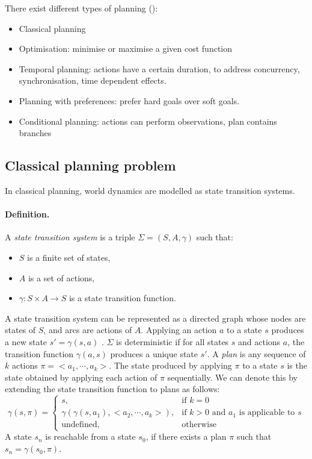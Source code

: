 There exist different types of planning (\cite{ROSplanAAAI17tutorial}):
\begin{itemize}
    \item Classical planning
    \item Optimisation: minimise or maximise a given cost function
    \item Temporal planning: actions have a certain duration, to address concurrency, synchronisation, time dependent effects.
    \item Planning with preferences: prefer hard goals over soft goals.
    \item Conditional planning: actions can perform observations, plan contains branches
\end{itemize}

\subsection{Classical planning problem}\label{subsec:Classical planning problem}
In classical planning, world dynamics are modelled as state transition systems.

\paragraph{Definition.}
A \textit{state transition system} is a triple $\Sigma = (S, A, \gamma)$ such that:
\begin{itemize}
\item $S$ is a finite set of states,
\item $A$ is a set of actions,
\item $\gamma : S \times A \rightarrow S$ is a state transition function.
\end{itemize}

\noindent A state transition system can be represented as a directed graph whose nodes are states of $S$, and arcs are actions of $A$. 
Applying an action $a$ to a state $s$ produces a new state $s'= \gamma(s,a)$ 
. 
$\Sigma$ is deterministic if for all states $s$ and actions $a$, the transition function $\gamma(a, s)$ produces a unique state $s'$. 
A \textit{plan} is any sequence of $k$ actions $\pi = <a_1,\cdots, a_k>$. The state produced by applying $\pi$ to a state $s$ is the state obtained by applying each action of $\pi$ sequentially. 
We can denote this by extending the state transition function to plans as follows:
\[\gamma(s,\pi)=\left\{
\begin{array}{ll}
   s, &\mbox{if $k=0$} \\
   \gamma(\gamma(s,a_1),<a_2,\cdots, a_k>), &\mbox{if $k>0$ and $a_1$ is applicable to $s$} \\
   \mbox{undefined}, &\mbox{otherwise}
\end{array}
\right.
\]
A state $s_n$ is reachable from a state $s_0$, if there exists a plan $\pi$ such that $s_{n} = \gamma(s_0, \pi)$.\\

